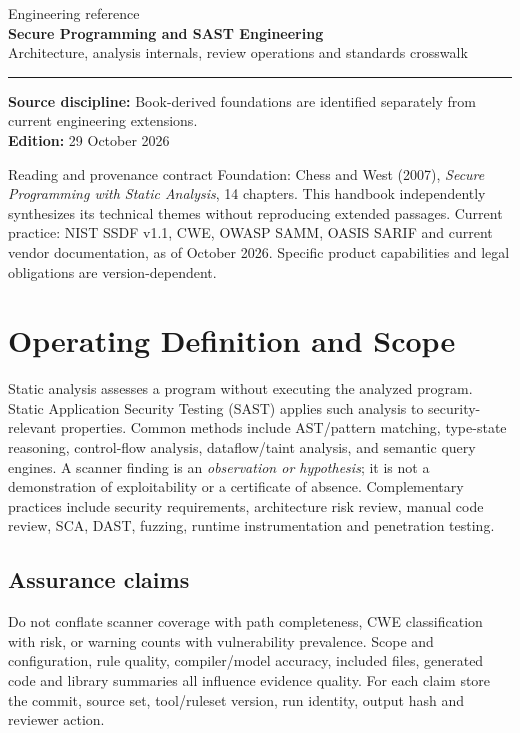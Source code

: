 \documentclass[10pt,letterpaper]{article}
\begin{document}
\hypersetup{pageanchor=false}%
\begin{titlepage}
\vspace*{1.0in}
{\color{bluegray}\Large Engineering reference}\\[1.0em]
{\color{navy}\Huge\bfseries Secure Programming and SAST Engineering}\\[0.7em]
{\Large Architecture, analysis internals, review operations and standards crosswalk}\\[2.0em]
\rule{\linewidth}{1.0pt}
\vfill
\textbf{Source discipline:} Book-derived foundations are identified separately from current engineering extensions.\\
\textbf{Edition:} 29 October 2026
\end{titlepage}\hypersetup{pageanchor=true}
\tableofcontents
\clearpage
\begin{focusbox}{Reading and provenance contract}
Foundation: Chess and West (2007), \emph{Secure Programming with Static Analysis}, 14 chapters. This handbook independently synthesizes its technical themes without reproducing extended passages. Current practice: NIST SSDF v1.1, CWE, OWASP SAMM, OASIS SARIF and current vendor documentation, as of October 2026. Specific product capabilities and legal obligations are version-dependent.
\end{focusbox}
\section{Operating Definition and Scope}
Static analysis assesses a program without executing the analyzed program. Static Application Security Testing (SAST) applies such analysis to security-relevant properties. Common methods include AST/pattern matching, type-state reasoning, control-flow analysis, dataflow/taint analysis, and semantic query engines. A scanner finding is an \emph{observation or hypothesis}; it is not a demonstration of exploitability or a certificate of absence. Complementary practices include security requirements, architecture risk review, manual code review, SCA, DAST, fuzzing, runtime instrumentation and penetration testing.
\subsection{Assurance claims}
Do not conflate scanner coverage with path completeness, CWE classification with risk, or warning counts with vulnerability prevalence. Scope and configuration, rule quality, compiler/model accuracy, included files, generated code and library summaries all influence evidence quality. For each claim store the commit, source set, tool/ruleset version, run identity, output hash and reviewer action.
\end{document}
